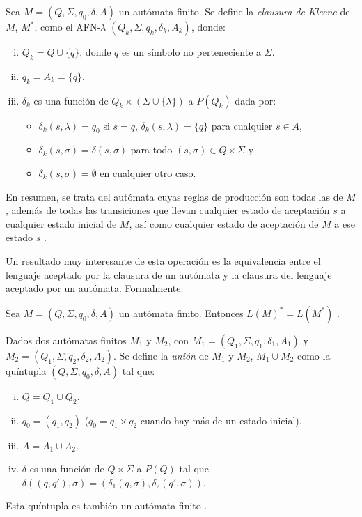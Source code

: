 \begin{definicion} Sea $M=(Q,\Sigma,q_0,\delta,A)$ un autómata finito. Se define la
\textit{clausura de Kleene} de $M$, $M^*$, como el AFN-$\lambda$ $(Q_k,\Sigma,q_k,\delta_k,A_k)$, donde:
\begin{enumerate}[(i)]
    \item $Q_k=Q\cup\{q\}$, donde $q$ es un símbolo no perteneciente a $\Sigma$.
    \item $q_k=A_k=\{q\}$.
    \item $\delta_k$ es una función de $Q_k\times(\Sigma\cup\{\lambda\})$ a $P(Q_k)$ dada por:
    \begin{itemize}
        \item $\delta_k(s,\lambda)=q_0$ si $s=q$, $\delta_k(s,\lambda)=\{q\}$ para cualquier $s\in A$,
        \item $\delta_k(s,\sigma)=\delta(s,\sigma)$ para todo $(s,\sigma)\in Q\times\Sigma$ y
        \item $\delta_k(s,\sigma)=\emptyset$ en cualquier otro caso.
    \end{itemize}
\end{enumerate}
En resumen, se trata del autómata cuyas reglas de producción son todas las de $M$, además de todas las transiciones
que llevan cualquier estado de aceptación $s$ a cualquier estado inicial de $M$, así como cualquier estado de 
aceptación de $M$ a ese estado $s$ \cite{kls_auto}.
\end{definicion}

Un resultado muy interesante de esta operación es la equivalencia entre el lenguaje aceptado por la clausura de un
autómata y la clausura del lenguaje aceptado por un autómata. Formalmente:

\begin{proposicion}Sea $M=(Q,\Sigma,q_0,\delta,A)$ un autómata finito. Entonces $L(M)^*=L(M^*)$ \cite{kls_auto}.
\label{prop:clau-auto}
\end{proposicion}

\begin{definicion} Dados dos autómatas finitos $M_1$ y $M_2$, con 
$M_1=(Q_1,\Sigma,q_1,\delta_1,A_1)$ y $M_2=(Q_1,\Sigma,q_2,\delta_2,A_2)$. Se define la \textit{unión} de $M_1$ y 
$M_2$, $M_1\cup M_2$ como la quíntupla $(Q,\Sigma,q_0,\delta,A)$ tal que:
\begin{enumerate}[(i)]
    \item $Q=Q_1\cup Q_2$.
    \item $q_0=(q_1,q_2)$ ($q_0=q_1\times q_2$ cuando hay más de un estado inicial).
    \item $A=A_1\cup A_2$.
    \item $\delta$ es una función de $Q\times\Sigma$ a $P(Q)$ tal que 
    $\delta((q,q'),\sigma)=(\delta_1(q,\sigma),\delta_2(q',\sigma))$.
\end{enumerate}
Esta quíntupla es también un autómata finito \cite{union_auto}.
\end{definicion}

